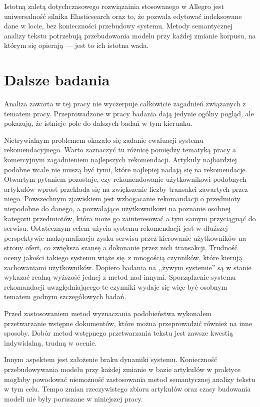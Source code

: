 \documentclass[pl]{minipw} %
\begin{document}
Istotną zaletą dotychczasowego rozwiązainia stosowanego w Allegro jest uniwersalność silnika Elasticsearch oraz to, że pozwala edytować indeksowane dane w locie, bez konieczności przebudowy systemu. Metody semantycznej analizy tekstu potrzebują przebudowania modelu przy każdej zmianie korpusu, na którym się opierają --- jest to ich istotna wada.


\section{Dalsze badania}

Analiza zawarta w tej pracy nie wyczerpuje całkowicie zagadnień związanych z tematem pracy. Przeprowadzone w pracy badania dają jedynie ogólny pogląd, ale pokazują, że istnieje pole do dalszych badań w tym kierunku.

Nietrywialnym problemem okazało się zadanie ewaluacji systemu rekomendacyjnego. Warto zaznaczyć tu różnicę pomiędzy tematyką pracy a komercyjnym zagadnieniem najlepszych rekomendacji. Artykuły najbardziej podobne wcale nie muszą być tymi, które najlepiej nadają się na rekomendacje. Otwartym pytaniem pozostaje, czy rekomendowanie użytkownikowi podobnych artykułów wprost przekłada się na zwiększenie liczby transakci zawartych przez niego. Powszechnym zjawiskiem jest wzbogacanie rekomandacji o przedmioty niepodobne do danego, a pozwalające użytkownikowi na poznanie osobnej kategorii przedmiotów, która może go zainteresować a tym samym przyciągnąć do serwisu. Ostatecznym celem użycia systemu rekomendacji jest w dłuższej perspektywie maksymalizacja zysku serwisu przez kierowanie użytkowników na strony ofert, co zwiększa szansę a dokonanie przez nich transakcji. Trudność oceny jakości takiego systemu wiąże się z mnogością czynników, które kierują zachowaniami użytkowników. Dopiero badania na ,,żywym systemie'' są w stanie wykazać realną wyższość jednej z metod nad innymi. Sporządzenie systemu rekomandacji uwzględniającego te czynniki wydaje się więc być osobnym tematem godnym szczegółowych badań.

Przed zastosowaniem metod wyznaczania podobieństwa wykonałem przetwarzanie wstępne dokumentów, które można przeprowadzić również na inne sposoby. Dobór metod wstępnego przetwarzania tekstu jest zawsze kwestią indywidalną, trudną w ocenie.

Innym aspektem jest założenie braku dynamiki systemu. Konieczność przebudowywania modelu przy każdej zmianie w bazie artykułów w praktyce mogłaby powodować niemożność zastosowania metod semantycznej analizy tekstu w tym celu. Tempo zmian rzeczywistego zbioru artykułów oraz czasy budowania modeli nie były poruszane w niniejszej pracy.
\end{document}
